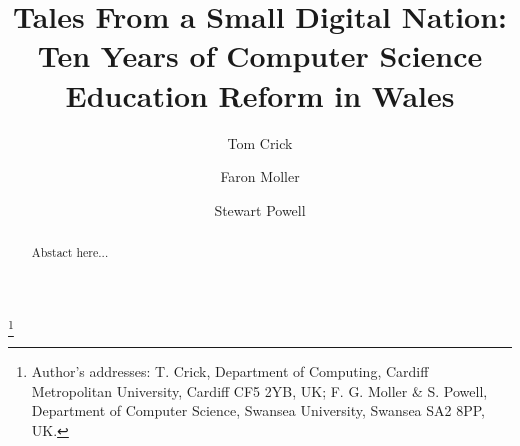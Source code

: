 \documentclass[format=acmsmall, review=false, screen=true]{acmart}
\begin{document}
\title[Ten Years of Computer Science Education Reform in Wales]{Tales From a Small
  Digital Nation: Ten Years of Computer Science Education Reform in Wales}

\author{Tom Crick}

\author{Faron Moller}

\author{Stewart Powell}

\begin{abstract}
Abstact here...
\end{abstract}


%
%

%
%




\thanks{Author's addresses: T. Crick, Department of Computing,
Cardiff Metropolitan University, Cardiff CF5 2YB, UK; F. G. Moller \&
S. Powell, Department of
Computer Science, Swansea University, Swansea SA2 8PP, UK.}


\maketitle

\renewcommand{\shortauthors}{Crick et al.}


\end{document}
